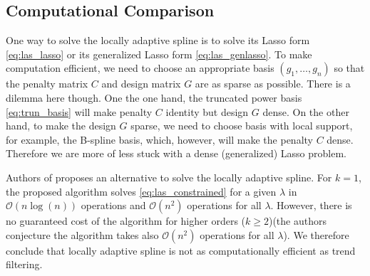 \documentclass[a4paper]{article}
\renewcommand{\cal}{\mathcal}
\begin{document}
\subsection{Computational Comparison}
One way to solve the locally adaptive spline is to solve its Lasso form \eqref{eq:las_lasso} or its generalized Lasso form \eqref{eq:las_genlasso}. To make computation efficient, we need to choose an appropriate basis $(g_1,\ldots,g_n)$ so that the penalty matrix $C$ and design matrix $G$ are as sparse as possible. There is a dilemma here though. One the one hand, the truncated power basis \eqref{eq:trun_basis} will make penalty $C$ identity but design $G$ dense. On the other hand, to make the design $G$ sparse, we need to choose basis with local support, for example, the B-spline basis, which, however, will make the penalty $C$ dense. Therefore we are more of less stuck with a dense (generalized) Lasso problem.

Authors of \cite{mammen1997locally} proposes an alternative to solve the locally adaptive spline. For $k = 1$, the proposed algorithm solves \eqref{eq:las_constrained} for a given $\lambda$ in $\cal{O}(n\log(n))$ operations and $\cal{O}(n^2)$ operations for all $\lambda$. However, there is no guaranteed cost of the algorithm for higher orders ($k\geq 2$)(the authors conjecture the algorithm takes also $\cal{O}(n^2)$ operations for all $\lambda$). We therefore conclude that locally adaptive spline is not as computationally efficient as trend filtering. 



\end{document}
